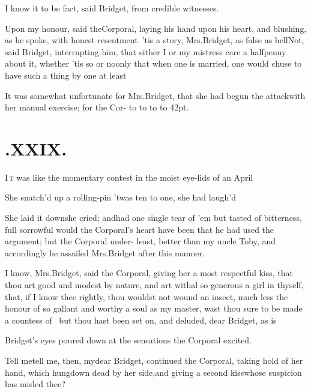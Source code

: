 \documentclass{article}
\begin{document}
\tsk I know it to be fact, said Bridget, from credible
witnesses.

\tsh Upon my honour, said the\break Corporal, laying his hand
upon his heart, and blushing, as he spoke, with honest
resentment\tsk\ ’tis a story, Mrs.\@ Bridget, as false
as hell\tsh Not, said Bridget, interrupting him,
that either I or my mistress care a halfpenny about it, whether
’tis so or no\tsh only that when one is married, one
would chuse to have such a thing by one at least\tsh

\newpage
It was somewhat unfortunate for Mrs.\break Bridget, that she
had begun the attack\break with her manual exercise; for the Cor-\break 
\hbox to 
\hbox to \hsize{\starfill}
\hbox to \hsize{\starfill}
\hbox to 42pt{\starfill}.

\newpage
\section{.\enspace XXIX.}

\lettrine{I}{\,t} was like the momentary contest in
the moist eye-lids of an April\break
{} 

She snatch’d up a rolling-pin\tsh\break
’twas ten to one, she had laugh’d\tsh

She laid it down\tsh she cried; and\break had one single tear
of ’em but tasted of bitterness, full sorrowful would the
Corporal’s heart have been that he had used the
argument; but the Corporal under-
least, better than my uncle Toby, and\break
accordingly he assailed Mrs.\@ Bridget after this manner.

\newpage
I know, Mrs.\@ Bridget, said the Corporal, giving her a
most respectful kiss, that thou art good and modest by nature, and
art withal so generous a girl in thyself, that, if I know thee
rightly, thou wouldst not wound an insect, much less the
honour of so gallant and worthy a soul as my master, wast thou sure
to be made a countess of \tsh\ but thou hast been set on,
and deluded, dear Bridget, as is

Bridget’s eyes poured down at the sensations the
Corporal excited.

\tsh Tell me\tsh tell me, then, my\break dear
Bridget, continued the Corporal, taking hold of her hand,
which hung\pb down dead by her side,\tsh and giving a second
kiss\tsh whose suspicion has misled thee?
\end{document}
